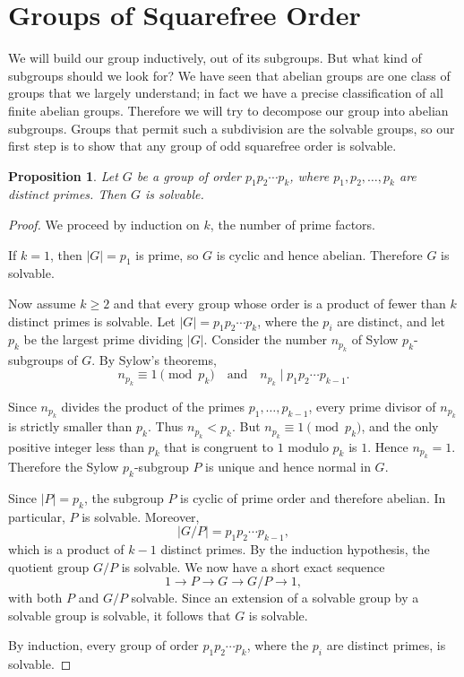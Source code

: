 \documentclass[12pt,reqno]{amsart}
\theoremstyle{plain}
\newtheorem{prop}[thm]{Proposition}
\theoremstyle{definition}
\numberwithin{equation}{section}
\begin{document}
\section{Groups of Squarefree Order}

We will build our group inductively, out of its subgroups. But what kind of subgroups should we look for? We have seen that abelian groups are one class of groups that we largely understand; in fact we have a precise classification of all finite abelian groups. Therefore we will try to decompose our group into abelian subgroups. Groups that permit such a subdivision are the solvable groups, so our first step is to show that any group of odd squarefree order is solvable.

\begin{prop}
Let $G$ be a group of order $p_1 p_2 \cdots p_k$, where $p_1, p_2, \dots, p_k$ are distinct primes. Then $G$ is solvable.
\end{prop}
\begin{proof}
We proceed by induction on $k$, the number of prime factors.

If $k=1$, then $|G|=p_1$ is prime, so $G$ is cyclic and hence abelian. Therefore $G$ is solvable.

Now assume $k\ge 2$ and that every group whose order is a product of fewer than $k$ distinct primes is solvable. Let $|G|=p_1p_2\cdots p_k$,
where the $p_i$ are distinct, and let $p_k$ be the largest prime dividing $|G|$. Consider the number $n_{p_k}$ of Sylow $p_k$-subgroups of $G$. By Sylow's theorems,
\[
n_{p_k}\equiv 1 \pmod{p_k} \quad \text{and} \quad 
n_{p_k}\mid p_1p_2\cdots p_{k-1}.
\]

Since $n_{p_k}$ divides the product of the primes $p_1,\dots,p_{k-1}$, every prime divisor of $n_{p_k}$ is strictly smaller than $p_k$. Thus $n_{p_k}<p_k$. 
But $n_{p_k}\equiv 1 \pmod{p_k}$, and the only positive integer less than $p_k$ that is congruent to $1$ modulo $p_k$ is $1$. Hence $n_{p_k}=1$. 
Therefore the Sylow $p_k$-subgroup $P$ is unique and hence normal in $G$.

Since $|P|=p_k$, the subgroup $P$ is cyclic of prime order and therefore abelian. In particular, $P$ is solvable. Moreover,
\[
|G/P|=p_1p_2\cdots p_{k-1},
\]
which is a product of $k-1$ distinct primes. By the induction hypothesis, the quotient group $G/P$ is solvable.
We now have a short exact sequence
\[
1 \longrightarrow P \longrightarrow G \longrightarrow G/P \longrightarrow 1,
\]
with both $P$ and $G/P$ solvable. Since an extension of a solvable group by a solvable group is solvable, it follows that $G$ is solvable.

By induction, every group of order $p_1p_2\cdots p_k$, where the $p_i$ are distinct primes, is solvable.
\end{proof}
\end{document}
